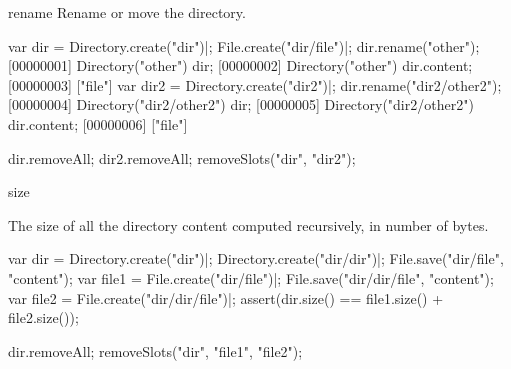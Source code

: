 \begin{urbiscriptapi}
\item[rename]
  Rename or move the directory.
\begin{urbiscript}
var dir = Directory.create("dir")|;
File.create("dir/file")|;
dir.rename("other");
[00000001] Directory("other")
dir;
[00000002] Directory("other")
dir.content;
[00000003] ["file"]
var dir2 = Directory.create("dir2")|;
dir.rename("dir2/other2");
[00000004] Directory("dir2/other2")
dir;
[00000005] Directory("dir2/other2")
dir.content;
[00000006] ["file"]
\end{urbiscript}
\begin{urbicomment}
dir.removeAll;
dir2.removeAll;
removeSlots("dir", "dir2");
\end{urbicomment}


\item[size]
  \experimental{}

  The size of all the directory content computed recursively, in number of
  bytes.
\begin{urbiscript}
var dir = Directory.create("dir")|;
Directory.create("dir/dir")|;
File.save("dir/file", "content");
var file1 = File.create("dir/file")|;
File.save("dir/dir/file", "content");
var file2 = File.create("dir/dir/file")|;
assert(dir.size() == file1.size() + file2.size());
\end{urbiscript}
\begin{urbicomment}
dir.removeAll;
removeSlots("dir", "file1", "file2");
\end{urbicomment}
\end{urbiscriptapi}

